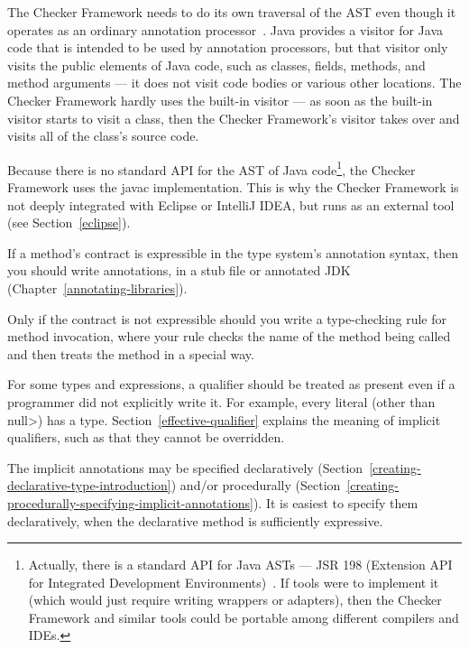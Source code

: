 The Checker Framework needs to do its own traversal of the AST even though
it operates as an ordinary annotation processor~\cite{JSR269}.  Java
provides a visitor for Java code that is intended to be used by annotation
processors, but that visitor only
visits the public elements of Java code, such as classes, fields, methods,
and method arguments --- it does not visit code bodies or various other
locations.  The Checker Framework hardly uses the built-in visitor --- as
soon as the built-in visitor starts to visit a class, then the Checker
Framework's visitor takes over and visits all of the class's source code.

Because there is no standard API for the AST of Java
code\footnote{Actually, there is a standard API for Java ASTs --- JSR 198
  (Extension API for Integrated Development Environments)~\cite{JSR198}.
  If tools were to implement it (which would just require writing wrappers
  or adapters), then the Checker Framework and similar tools could be
  portable among different compilers and IDEs.}, the Checker Framework uses
the javac implementation.  This is why the Checker Framework is not deeply
integrated with Eclipse or IntelliJ IDEA, but runs as an external tool (see
Section~\ref{eclipse}).



If a method's contract is expressible in the type system's annotation
syntax, then you should write annotations, in a stub file or annotated JDK
(Chapter~\ref{annotating-libraries}).

Only if the contract is not expressible should you write a type-checking
rule for method invocation, where your rule checks the name of the method
being called and then treats the method in a special way.



For some types and expressions, a qualifier should be treated as present
even if a programmer did not explicitly write it.  For example, every
literal (other than \<null>) has a  type.
Section~\ref{effective-qualifier} explains the meaning of implicit
qualifiers, such as that they cannot be overridden.

The implicit annotations may be specified declaratively
(Section~\ref{creating-declarative-type-introduction}) and/or procedurally
(Section~\ref{creating-procedurally-specifying-implicit-annotations}).
It is easiest to specify them declaratively, when the declarative method is
sufficiently expressive.

